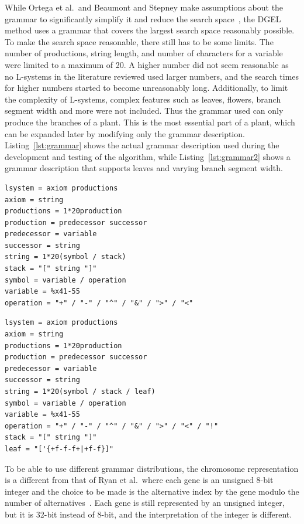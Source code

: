 While Ortega et al.\ and Beaumont and Stepney make assumptions about the grammar to significantly simplify it and reduce the search space~\cite{2003Ortega, 2009Beaumont}, the \gls{DGEL} method uses a grammar that covers the largest search space reasonably possible.
To make the search space reasonable, there still has to be some limits.
The number of productions, string length, and number of characters for a variable were limited to a maximum of 20.
A higher number did not seem reasonable as no \glspl{L-system} in the literature reviewed used larger numbers, and the search times for higher numbers started to become unreasonably long.
Additionally, to limit the complexity of \glspl{L-system}, complex features such as leaves, flowers, \gls{branch segment} width and more were not included.
Thus the grammar used can only produce the branches of a plant.
This is the most essential part of a plant, which can be expanded later by modifying only the grammar description.
Listing~\ref{lst:grammar} shows the actual grammar description used during the development and testing of the algorithm, while Listing~\ref{lst:grammar2} shows a grammar description that supports leaves and varying \gls{branch segment} width.

\begin{lstlisting}[caption={[ABNF grammar description used in DGEL]{ABNF grammar description used in \gls{DGEL}}}, label=lst:grammar, float]
lsystem = axiom productions
axiom = string
productions = 1*20production
production = predecessor successor
predecessor = variable
successor = string
string = 1*20(symbol / stack)
stack = "[" string "]"
symbol = variable / operation
variable = %x41-55
operation = "+" / "-" / "^" / "&" / ">" / "<"
\end{lstlisting}

\begin{lstlisting}[caption=ABNF grammar description supporting leaves and varying \gls{branch segment} width, label=lst:grammar2, float]
lsystem = axiom productions
axiom = string
productions = 1*20production
production = predecessor successor
predecessor = variable
successor = string
string = 1*20(symbol / stack / leaf)
symbol = variable / operation
variable = %x41-55
operation = "+" / "-" / "^" / "&" / ">" / "<" / "!"
stack = "[" string "]"
leaf = "['{+f-f-f+|+f-f}]"
\end{lstlisting}

To be able to use different grammar distributions, the chromosome representation is a different from that of Ryan et al.\ where each gene is an unsigned 8-bit integer and the choice to be made is the alternative index by the gene modulo the number of alternatives~\cite{1998Ryan}.
Each gene is still represented by an unsigned integer, but it is 32-bit instead of 8-bit, and the interpretation of the integer is different.

